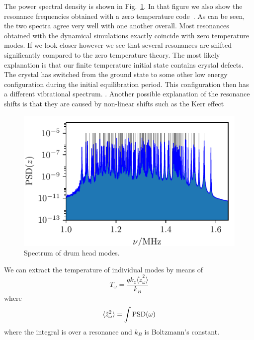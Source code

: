 \documentclass[aps, pra, preprint]{revtex4-1}
\begin{document}
The power spectral density is shown in
Fig.~\ref{fig:axial_spectrum}. In that figure we also show the
resonance frequencies obtained with a zero temperature
code~. As can be seen, the two
spectra agree very well with one another overall. Most resonances
obtained with the dynamical simulations exactly coincide with
zero temperature modes. If we look closer however we see that
several resonances are shifted significantly compared to the zero
temperature theory. The most likely explanation is that our
finite temperature initial state contains crystal defects. The
crystal has switched from the ground state to some other low
energy configuration during the initial equilibration period.
This configuration then has a different vibrational spectrum.
. Another possible
explanation of the resonance shifts is that they are caused by
non-linear shifts such as the Kerr effect 

\begin{figure}
  \includegraphics{./figures/fig_axial_spectrum.pdf}
  \caption{Spectrum of drum head modes.}
  \label{fig:axial_spectrum}
\end{figure}

We can extract the temperature of individual modes by means of
\begin{equation}
T_\omega = \frac{qk_z\langle \tilde{z}_\omega^2 \rangle}{k_B}
\end{equation}
where
\begin{equation}
  \langle \tilde{z}_\omega^2 \rangle =
  \int {\rm PSD}(\omega)
\end{equation}
where the integral is over a resonance and $k_B$ is Boltzmann's
constant.
\end{document}
